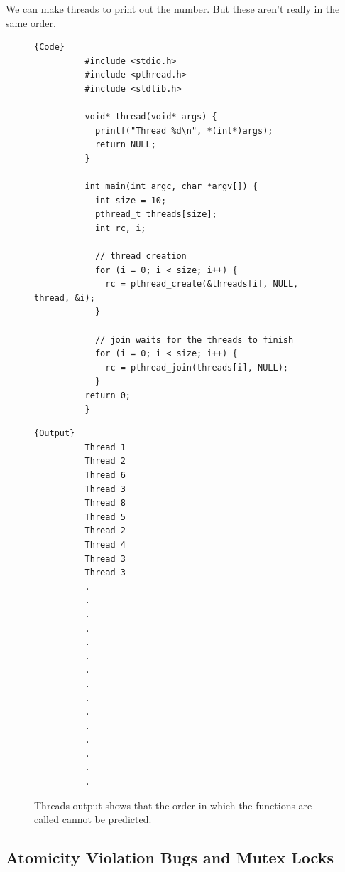 \documentclass{article}
\newcounter{example}[section]
\begin{document}
    \begin{example}
      \label{ex:simply-print-out-thread-number}
      We can make threads to print out the number. But these aren't really in the same order. 
      \begin{figure}[H]
        \centering 
        \noindent\begin{minipage}{.8\textwidth}
        \begin{lstlisting}[]{Code}
          #include <stdio.h> 
          #include <pthread.h>
          #include <stdlib.h>

          void* thread(void* args) {
            printf("Thread %d\n", *(int*)args); 
            return NULL; 
          }

          int main(int argc, char *argv[]) {
            int size = 10; 
            pthread_t threads[size]; 
            int rc, i;

            // thread creation 
            for (i = 0; i < size; i++) {
              rc = pthread_create(&threads[i], NULL, thread, &i); 
            }

            // join waits for the threads to finish 
            for (i = 0; i < size; i++) {
              rc = pthread_join(threads[i], NULL); 
            }
          return 0; 
          }
        \end{lstlisting}
        \end{minipage}
        \hfill
        \begin{minipage}{.19\textwidth}
        \begin{lstlisting}[]{Output}
          Thread 1
          Thread 2
          Thread 6
          Thread 3
          Thread 8
          Thread 5
          Thread 2
          Thread 4
          Thread 3
          Thread 3
          .
          .
          .
          .
          .
          .
          .
          .
          .
          .
          .
          .
          .
          .
          .
        \end{lstlisting}
        \end{minipage}
        \caption{Threads output shows that the order in which the functions are called cannot be predicted. } 
        \label{fig:threads}
      \end{figure}
    \end{example}

  \subsection{Atomicity Violation Bugs and Mutex Locks} 
\end{document}
